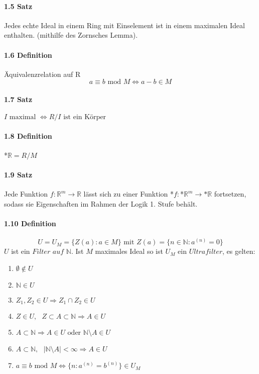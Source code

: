 \documentclass[a4paper]{article}
\begin{document}

\paragraph{1.5 Satz} Jedes echte Ideal in einem Ring mit Einselement ist in einem maximalen Ideal enthalten. (mithilfe des Zornsches Lemma).


\paragraph{1.6 Definition} Äquivalenzrelation auf R  %
$$ a \equiv b \text{ mod } M \iff a - b \in M $$

\paragraph{1.7 Satz} $ I \text{ maximal } \iff R/I  \text{ ist ein Körper} $

\paragraph{1.8 Definition}  *$\mathbb{R} = R/M $

\paragraph{1.9 Satz} 
Jede Funktion $f:\mathbb{R}^m \to \mathbb{R} $ lässt sich zu einer 
Funktion *$f:$*$\mathbb{R}^m \to \text{*}\mathbb{R}$ fortsetzen, sodass sie Eigenschaften im Rahmen 
der Logik 1. Stufe behält.


\paragraph{1.10 Definition}  
$$ U = U_M = \{Z(a): a \in M\} \text{ mit } Z(a) = \{n \in \mathbb{N}: a^{(n)} = 0\} $$
$U $ ist ein $\textit{Filter auf } \mathbb{N} $. Ist $ M $ maximales Ideal so ist $ U_M $ ein $ Ultrafilter $, es gelten: 
\begin{enumerate}
      \item $ \emptyset \notin U $      
      \item $ \mathbb{N} \in U$ 
      \item $ Z_1, Z_2 \in U \Rightarrow Z_1 \cap Z_2 \in U$ 
      \item $ Z \in U, \text{ } Z \subset A \subset \mathbb{N} \Rightarrow A \in U$ 
      \item $ A \subset  \mathbb{N} \Rightarrow A \in U \text{ oder } \mathbb{N} \setminus A \in U$ 
      \item $ A \subset  \mathbb{N}, \text{ } |\mathbb{N} \setminus A| < \infty \Rightarrow A \in U$ 
      \item $a \equiv b \text{ mod } M \iff \{n: a^{(n)} = b^{(n)}\} \in U_M$
\end{enumerate}
\end{document}

